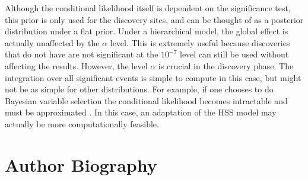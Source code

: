 \documentclass[AMA,STIX1COL]{WileyNJD-v2}\usepackage[]{graphicx}\usepackage[]{color}
\begin{document}
Although the conditional likelihood itself is dependent on the significance test, this prior is only used for the discovery sites, and can be thought of as a posterior distribution under a flat prior. Under a hierarchical model, the global effect is actually unaffected by the $\alpha$ level. This is extremely useful because discoveries that do not have are not significant at the $10^{-7}$ level can still be used without affecting the results. However, the level $\alpha$ is crucial in the discovery phase. The integration over all significant events is simple to compute in this case, but might not be as simple for other distributions. For example, if one chooses to do Bayesian variable selection the conditional likelihood becomes intractable and must be approximated \cite{panigrahi2016bayesian}. In this case, an adaptation of the HSS model may actually be more computationally feasible.



\nocite{*}%


\clearpage

\section*{Author Biography}
\end{document}
